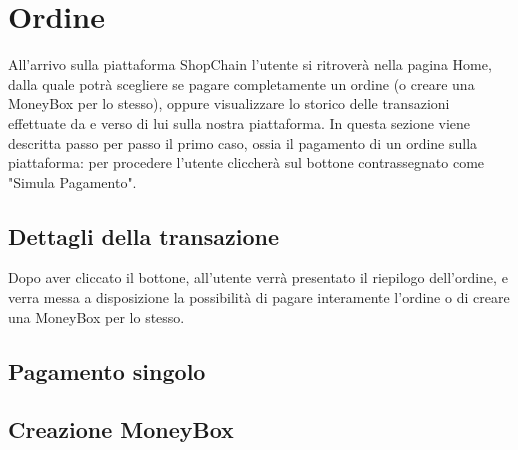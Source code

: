 \section{Ordine}

All'arrivo sulla piattaforma ShopChain l'utente si ritroverà nella pagina Home,
 dalla quale potrà scegliere se pagare completamente un ordine (o creare una MoneyBox per lo stesso),
 oppure visualizzare lo storico delle transazioni effettuate da e verso di lui sulla nostra piattaforma.
In questa sezione viene descritta passo per passo il primo caso, ossia il pagamento di un ordine sulla piattaforma: 
per procedere l'utente cliccherà sul bottone contrassegnato come "Simula Pagamento".


\subsection{Dettagli della transazione}

Dopo aver cliccato il bottone, all'utente verrà presentato il riepilogo dell'ordine, e verra messa a disposizione la possibilità
 di pagare interamente l'ordine o di creare una MoneyBox per lo stesso.


\subsection{Pagamento singolo}



\subsection{Creazione MoneyBox}

